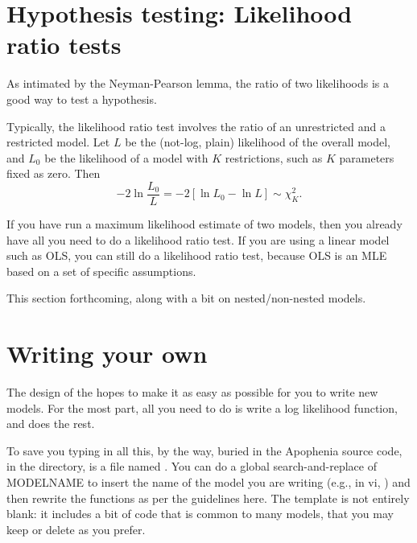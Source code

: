 
\section{Hypothesis testing: Likelihood ratio tests} 
As intimated by the Neyman-Pear\-son lemma, the ratio of two
likelihoods is a good way to test a hypothesis. 

Typically, the likelihood ratio test involves the ratio of an
unrestricted and a restricted model. Let $L$ be the (not-log, plain)
likelihood of the overall model, and $L_0$ be the likelihood of a
model with $K$ restrictions, such as $K$ parameters fixed as zero. Then
$$-2\ln\frac{L_0}{L} = -2[\ln L_0 - \ln L] \sim \chi^2_K.$$

If you have run a maximum likelihood estimate of two models, then you
already have all you need to do a likelihood ratio test. 
If you are using a linear model such as OLS, you can still do a
likelihood ratio test, because OLS is an MLE based on a set of specific
assumptions.

This section forthcoming, along with a bit on nested/non-nested models.

\section{Writing your own} \label{writeyourown}
The design of the  hopes to make it as easy as
possible for you to write new models. For the most
part, all you need to do is write a log likelihood function, and
 does the rest.  

To save you typing in all this, by the way, buried in the Apophenia
source code, in the  directory, is a file named
.  
You can do a global search-and-replace of MODELNAME to insert the name
of the model you are writing (e.g., in vi, )
and then rewrite the functions as per the guidelines here. The template
is not entirely blank: it includes a bit of code that is common to many
models, that you may keep or delete as you prefer.

